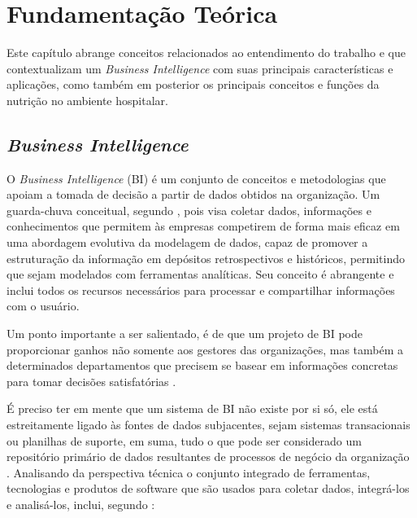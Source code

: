 \chapter{Fundamentação Teórica}\label{cap_fundamentos}

Este capítulo abrange conceitos relacionados ao entendimento do trabalho e que contextualizam um \textit{Business Intelligence} com suas principais características e aplicações, como também em posterior os principais conceitos e funções da nutrição no ambiente hospitalar. 

\section{\textit{Business Intelligence}}
O \textit{Business Intelligence} (BI) é um conjunto de conceitos e metodologias que apoiam a tomada de decisão a partir de dados obtidos na organização. Um guarda-chuva conceitual, segundo , pois visa coletar dados, informações e conhecimentos que permitem às empresas competirem de forma mais eficaz em uma abordagem evolutiva da modelagem de dados, capaz de promover a estruturação da informação em depósitos retrospectivos e históricos, permitindo que sejam modelados com ferramentas analíticas. Seu conceito é abrangente e inclui todos os recursos necessários para processar e compartilhar informações com o usuário.

Um ponto importante a ser salientado, é de que um projeto de BI pode proporcionar ganhos não somente aos gestores das organizações, mas também a determinados departamentos que precisem se basear em informações concretas para tomar decisões satisfatórias \cite{antonelli2009}.

É preciso ter em mente que um sistema de BI não existe por si só, ele está estreitamente ligado às fontes de dados subjacentes, sejam sistemas transacionais ou planilhas de suporte, em suma, tudo o que pode ser considerado um repositório primário de dados resultantes de processos de negócio da organização \cite{sezoes2006}. Analisando da perspectiva técnica o conjunto integrado de ferramentas, tecnologias e produtos de software que são usados para coletar dados, integrá-los e analisá-los, inclui, segundo :

